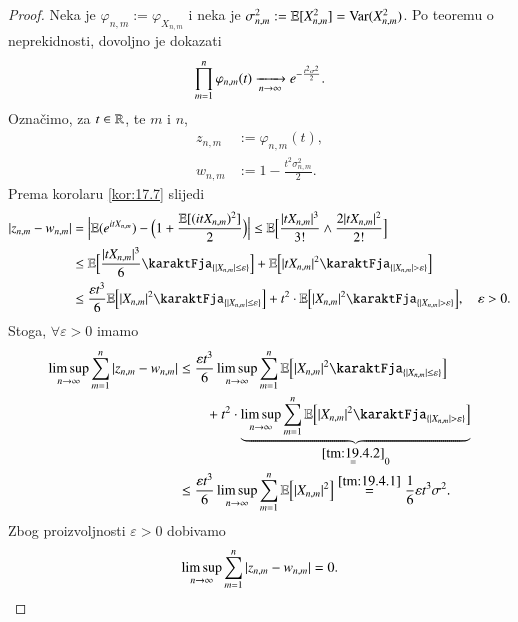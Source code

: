 \begin{proof}
    Neka je $\varphi_{n, m} := \varphi_{X_{n, m}}$ i neka je $\sigma^2_{n, m} := \mathbb{E} [X_{n, m}^2] = \mathrm{Var} (X_{n, m}^2)$.
    Po teoremu o neprekidnosti, dovoljno je dokazati
    \begin{equation*}
        \prod\limits_{m = 1}^{n} \varphi_{n, m} (t) \xrightarrow[n \to \infty]{} e^{-\frac{t^2 \sigma^2}{2}}.
    \end{equation*}
    Ozna\v cimo, za $t \in \mathbb{R}$, te $m$ i $n$,
    \begin{equation*}
        \begin{aligned}
            z_{n, m} &:= \varphi_{n, m} (t),\\
            w_{n, m} &:= 1 - \frac{t^2 \sigma_{n, m}^2}{2}.
        \end{aligned}
    \end{equation*}
    Prema korolaru \ref{kor:17.7} slijedi
    \begin{equation*}
        \begin{aligned}
            |z_{n, m} - w_{n, m}| &= \Big| \masE (e^{i t X_{n, m}}) - \Big( 1 + \frac{\masE [ (i t X_{n, m})^2 ]}{2} \Big) \Big| \leq \masE \Big[ \frac{|t X_{n, m}|^3}{3!} \land \frac{2 |t X_{n, m}|^2}{2!} \Big]\\
            &\leq \masE \Big[ \frac{|t X_{n, m}|^3}{6} \karaktFja_{\{ |X_{n, m}| \leq \varepsilon \}} \Big] + \masE \Big[ |t X_{n, m}|^2 \karaktFja_{\{ |X_{n, m}| > \varepsilon \}} \Big]\\
            &\leq \frac{\varepsilon t^3}{6} \masE \Big[ |X_{n, m}|^2 \karaktFja_{\{ |X_{n, m}| \leq \varepsilon  \}} \Big] + t^2 \cdot \masE \Big[ |X_{n, m}|^2 \karaktFja_{\{ |X_{n, m}| > \varepsilon \}} \Big], \quad \varepsilon > 0.
        \end{aligned}
    \end{equation*}
    Stoga, $\forall \varepsilon > 0$ imamo
    \begin{equation*}
        \begin{aligned}
            \limsup\limits_{n \to \infty} \suma{m = 1}{n} |z_{n, m} - w_{n, m}| &\leq \frac{\varepsilon t^3}{6} \limsup\limits_{n \to \infty} \suma{m = 1}{n} \masE \Big[ |X_{n, m}|^2 \karaktFja_{\{ |X_{n, m}| \leq \varepsilon \}} \Big]\\
            &\quad \quad + t^2 \cdot \underbrace{\limsup\limits_{n \to \infty} \suma{m = 1}{n} \masE \Big[ |X_{n, m}|^2 \karaktFja_{\{|X_{n, m}| > \varepsilon \}} \Big]  }_{\overset{\ref{tm:19.4.2}}{=} 0}\\
            &\leq \frac{\varepsilon t^3}{6} \limsup\limits_{n \to \infty} \suma{m = 1}{n} \masE \Big[ |X_{n, m}|^2 \Big] \overset{\ref{tm:19.4.1}}{=} \frac{1}{6} \varepsilon t^3 \sigma^2.
        \end{aligned}
    \end{equation*}
    Zbog proizvoljnosti $\varepsilon > 0$ dobivamo
    \begin{equation}    \label{jed:19.5}
        \limsup\limits_{n \to \infty} \sum\limits_{m = 1}^{n} |z_{n, m} - w_{n, m}| = 0.
    \end{equation}


\end{proof}
